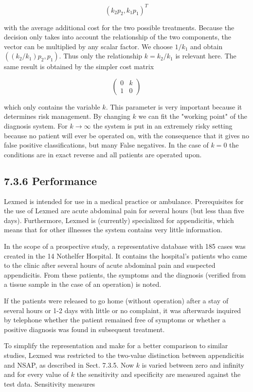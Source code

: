 \documentclass[10pt]{book}
\begin{document}
\begin{center}
\begin{enumerate}
$$
\left(k_{2} p_{2}, k_{1} p_{1}\right)^{T}
$$

with the average additional cost for the two possible treatments. Because the decision only takes into account the relationship of the two components, the vector can be multiplied by any scalar factor. We choose $1 / k_{1}$ and obtain $\left(\left(k_{2} / k_{1}\right) p_{2}, p_{1}\right)$. Thus only the relationship $k=k_{2} / k_{1}$ is relevant here. The same result is obtained by the simpler cost matrix

$$
\left(\begin{array}{ll}
0 & k \\
1 & 0
\end{array}\right)
$$

which only contains the variable $k$. This parameter is very important because it determines risk management. By changing $k$ we can fit the "working point" of the diagnosis system. For $k \rightarrow \infty$ the system is put in an extremely risky setting because no patient will ever be operated on, with the consequence that it gives no false positive classifications, but many False negatives. In the case of $k=0$ the conditions are in exact reverse and all patients are operated upon.

\subsection*{7.3.6 Performance}
Lexmed is intended for use in a medical practice or ambulance. Prerequisites for the use of Lexmed are acute abdominal pain for several hours (but less than five days). Furthermore, Lexmed is (currently) specialized for appendicitis, which means that for other illnesses the system contains very little information.

In the scope of a prospective study, a representative database with 185 cases was created in the 14 Nothelfer Hospital. It contains the hospital's patients who came to the clinic after several hours of acute abdominal pain and suspected appendicitis. From these patients, the symptoms and the diagnosis (verified from a tissue sample in the case of an operation) is noted.

If the patients were released to go home (without operation) after a stay of several hours or 1-2 days with little or no complaint, it was afterwards inquired by telephone whether the patient remained free of symptoms or whether a positive diagnosis was found in subsequent treatment.

To simplify the representation and make for a better comparison to similar studies, Lexmed was restricted to the two-value distinction between appendicitis and NSAP, as described in Sect. 7.3.5. Now $k$ is varied between zero and infinity\\
and for every value of $k$ the sensitivity and specificity are measured against the test data. Sensitivity measures



\end{enumerate}
\end{center}
\end{document}
